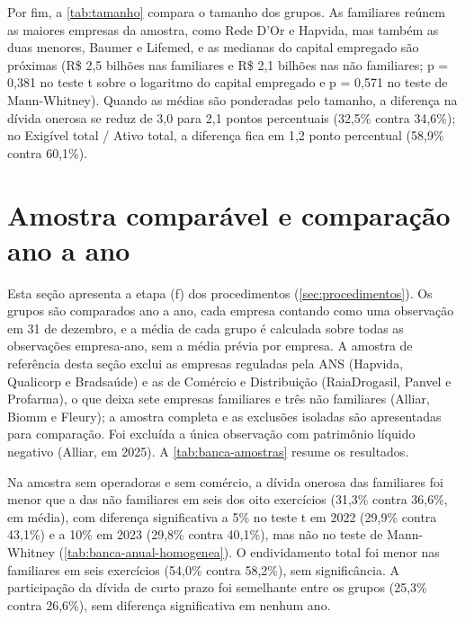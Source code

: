 Por fim, a \autoref{tab:tamanho} compara o tamanho dos grupos. As familiares
reúnem as maiores empresas da amostra, como Rede D'Or e Hapvida, mas também as duas
menores, Baumer e Lifemed, e as medianas do capital empregado são próximas (R\$ 2,5
bilhões nas familiares e R\$ 2,1 bilhões nas não familiares; p = 0,381 no teste t
sobre o logaritmo do capital empregado e p = 0,571 no teste de Mann-Whitney).
Quando as médias são ponderadas pelo tamanho, a diferença na dívida onerosa se
reduz de 3,0 para 2,1 pontos percentuais (32,5\% contra 34,6\%); no Exigível total /
Ativo total, a diferença fica em 1,2 ponto percentual (58,9\% contra 60,1\%).



\section{Amostra comparável e comparação ano a ano}\label{sec:ajustes}

Esta seção apresenta a etapa (f) dos procedimentos (\autoref{sec:procedimentos}).
Os grupos são comparados ano a ano, cada empresa contando como uma observação em 31
de dezembro, e a média de cada grupo é calculada sobre todas as observações
empresa-ano, sem a média prévia por empresa. A amostra de referência desta seção
exclui as empresas reguladas pela ANS (Hapvida, Qualicorp e Bradsaúde) e as de
Comércio e Distribuição (RaiaDrogasil, Panvel e Profarma), o que deixa sete
empresas familiares e três não familiares (Alliar, Biomm e Fleury); a amostra
completa e as exclusões isoladas são apresentadas para comparação. Foi excluída a
única observação com patrimônio líquido negativo (Alliar, em 2025). A
\autoref{tab:banca-amostras} resume os resultados.



Na amostra sem operadoras e sem comércio, a dívida onerosa das familiares foi menor
que a das não familiares em seis dos oito exercícios (31,3\% contra 36,6\%, em
média), com diferença significativa a 5\% no teste t em 2022 (29,9\% contra 43,1\%)
e a 10\% em 2023 (29,8\% contra 40,1\%), mas não no teste de Mann-Whitney
(\autoref{tab:banca-anual-homogenea}). O endividamento total foi menor nas
familiares em seis exercícios (54,0\% contra 58,2\%), sem significância. A
participação da dívida de curto prazo foi semelhante entre os grupos (25,3\% contra
26,6\%), sem diferença significativa em nenhum ano.

